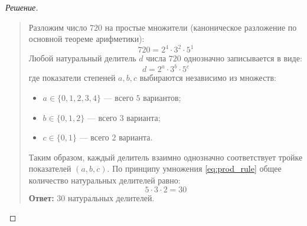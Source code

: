 \begin{proof}[Решение]~\\
    \begin{quote}
        Разложим число $720$ на простые множители (каноническое разложение 
        по основной теореме арифметики):
        \[
            720 = 2^4 \cdot 3^2 \cdot 5^1
        \]
        Любой натуральный делитель $d$ числа $720$ однозначно записывается 
        в виде:
        \[
            d = 2^a \cdot 3^b \cdot 5^c
        \]
        где показатели степеней $a, b, c$ выбираются независимо из 
        множеств:
        \begin{itemize}
            \item $a \in \{0, 1, 2, 3, 4\}$ --- всего $5$ вариантов;
            \item $b \in \{0, 1, 2\}$ --- всего $3$ варианта;
            \item $c \in \{0, 1\}$ --- всего $2$ варианта.
        \end{itemize}
        Таким образом, каждый делитель взаимно однозначно соответствует 
        тройке показателей $(a, b, c)$. По принципу умножения 
        \eqref{eq:prod_rule} общее количество натуральных делителей равно:
        \[
            5 \cdot 3 \cdot 2 = 30
        \]
        \textbf{Ответ:} $30$ натуральных делителей.
    \end{quote}
\end{proof}